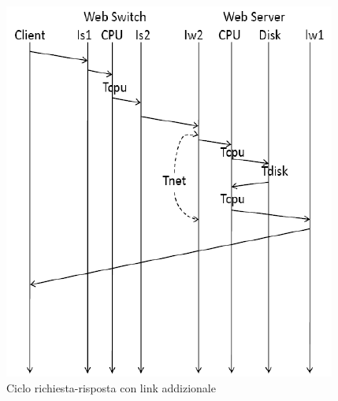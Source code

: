 \begin{figure}[H]
\begin{center}
\includegraphics[scale=0.62]{etc/webclient2.png}
\caption{Ciclo richiesta-risposta con link addizionale}
\label{webclient2}
\end{center}
\end{figure}

